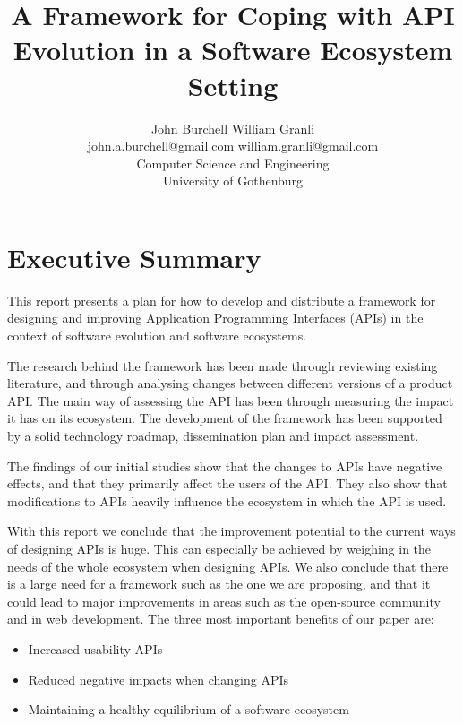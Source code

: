 \documentclass{article}
\title{A Framework for Coping with API Evolution in a Software Ecosystem Setting}
\begin{document}
\author{John Burchell \qquad William Granli \\
		john.a.burchell@gmail.com \qquad william.granli@gmail.com \\
		Computer Science and Engineering  \\
		University of Gothenburg }

\maketitle
\section{Executive Summary}
This report presents a plan for how to develop and distribute a framework for designing and improving Application Programming Interfaces (APIs) in the context of software evolution and software ecosystems. \smallskip

The research behind the framework has been made through reviewing existing literature, and through analysing changes between  different versions of a product API. The main way of assessing the API has been through measuring the impact it has on its ecosystem. The development of the framework has been supported by a solid technology roadmap, dissemination plan and impact assessment. \smallskip

The findings of our initial studies show that the changes to APIs have negative effects, and that they primarily affect the users of the API. They also show that modifications to APIs heavily influence the ecosystem in which the API is used. \smallskip

With this report we conclude that the improvement potential to the current ways of designing APIs is huge. This can especially be achieved by weighing in the needs of the whole ecosystem when designing APIs. We also conclude that there is a large need for a framework such as the one we are proposing, and that it could lead to major improvements in areas such as the open-source community and in web development. The three most important benefits of our paper are: 

\begin{itemize}
\item Increased usability APIs
\item Reduced negative impacts when changing APIs
\item Maintaining a healthy equilibrium of a software ecosystem
\end{itemize}
\end{document}
